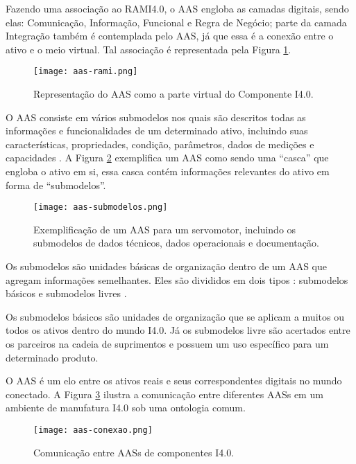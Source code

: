 	Fazendo uma associação ao RAMI4.0, o AAS engloba as camadas digitais, sendo elas: Comunicação, Informação, Funcional e Regra de Negócio; parte da camada Integração também é contemplada pelo AAS, já que essa é a conexão entre o ativo e o meio virtual. Tal associação é representada pela Figura \ref{fig:aas-rami}.

	\begin{figure}[H]
		\centering
		\caption{Representação do AAS como a parte virtual do Componente I4.0.}
		\texttt{[image: aas-rami.png]}
		\label{fig:aas-rami}
	\end{figure}
		
	O AAS consiste em vários submodelos nos quais são descritos todas as informações e funcionalidades de um determinado ativo, incluindo suas características, propriedades, condição, parâmetros, dados de medições e capacidades \cite{bader2019aas}. A Figura \ref{fig:aas-submodelos} exemplifica um AAS como sendo uma ``casca'' que engloba o ativo em si, essa casca contém informações relevantes do ativo em forma de ``submodelos''.
	
	\begin{figure}[H]
		\centering
		\caption{Exemplificação de um AAS para um servomotor, incluindo os submodelos de dados técnicos, dados operacionais e documentação.}
		\texttt{[image: aas-submodelos.png]}
		\label{fig:aas-submodelos}
	\end{figure}

	Os submodelos são unidades básicas de organização dentro de um AAS que agregam informações semelhantes. Eles são divididos em dois tipos \cite{plattform2019detailsaas}: submodelos básicos e submodelos livres \cite{bader2019aas}.
	
	Os submodelos básicos são unidades de organização que se aplicam a muitos ou todos os ativos dentro do mundo I4.0. Já os submodelos livre são acertados entre os parceiros na cadeia de suprimentos e possuem um uso específico para um determinado produto.
	
	O AAS é um elo entre os ativos reais e seus correspondentes digitais no mundo conectado. A Figura \ref{fig:aas-conexao} ilustra a comunicação entre diferentes AASs em um ambiente de manufatura I4.0 sob uma ontologia comum.
	
	\begin{figure}[H]
		\centering
		\caption{Comunicação entre AASs de componentes I4.0.}
		\texttt{[image: aas-conexao.png]}
		\label{fig:aas-conexao}
	\end{figure}

